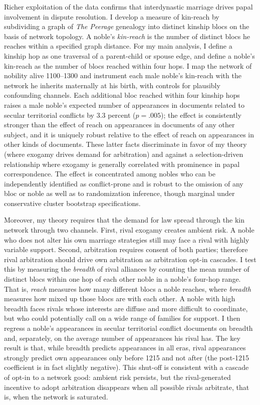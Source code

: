 \documentclass[12pt]{article}
\theoremstyle{definition}
\theoremstyle{remark}
\begin{document}
Richer exploitation of the data confirms that interdynastic marriage drives papal involvement in dispute resolution. I develop a measure of kin-reach by subdividing a graph of \textit{The Peerage} genealogy into distinct kinship blocs on the basis of network topology. A noble's \textit{kin-reach} is the number of distinct blocs he reaches within a specified graph distance. For my main analysis, I define a kinship hop as one traversal of a parent-child or spouse edge, and define a noble's kin-reach as the number of blocs reached within four hops. I map the network of nobility alive 1100--1300 and instrument each male noble's kin-reach with the network he inherits maternally at his birth, with controls for plausibly confounding channels. Each additional bloc reached within four kinship hops raises a male noble's expected number of appearances in documents related to secular territorial conflicts by $3.3$ percent ($p = .005$); the effect is consistently stronger than the effect of reach on appearances in documents of any other subject, and it is uniquely robust relative to the effect of reach on appearances in other kinds of documents. These latter facts discriminate in favor of my theory (where exogamy drives demand for arbitration) and against a selection-driven relationship where exogamy is generally correlated with prominence in papal correspondence. The effect is concentrated among nobles who can be independently identified as conflict-prone and is robust to the omission of any bloc or noble as well as to randomization inference, though marginal under conservative cluster bootstrap specifications.

Moreover, my theory requires that the demand for law spread through the kin network through two channels. First, rival exogamy creates ambient risk. A noble who does not alter his own marriage strategies still may face a rival with highly variable support. Second, arbitration requires consent of both parties; therefore rival arbitration should drive own arbitration as arbitration opt-in cascades. I test this by measuring the \textit{breadth} of rival alliances by counting the mean number of distinct blocs within one hop of each other noble in a noble's four-hop range. That is, \textit{reach} measures how many different blocs a noble reaches, where \textit{breadth} measures how mixed up those blocs are with each other. A noble with high breadth faces rivals whose interests are diffuse and more difficult to coordinate, but who could potentially call on a wide range of families for support. I then regress a noble's appearances in secular territorial conflict documents on breadth and, separately, on the average number of appearances his rival has. The key result is that, while breadth predicts appearances in all eras, rival appearances strongly predict own appearances only before 1215 and not after (the post-1215 coefficient is in fact slightly negative). This shut-off is consistent with a cascade of opt-in to a network good: ambient risk persists, but the rival-generated incentive to adopt arbitration disappears when all possible rivals arbitrate, that is, when the network is saturated.
\end{document}
